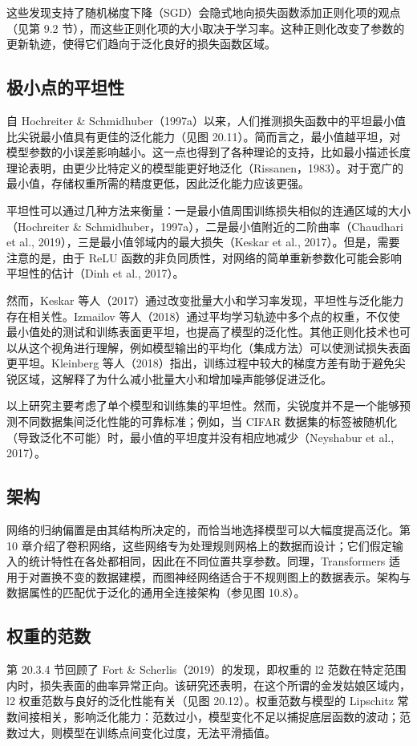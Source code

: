 这些发现支持了随机梯度下降（SGD）会隐式地向损失函数添加正则化项的观点（见第 9.2 节），而这些正则化项的大小取决于学习率。这种正则化改变了参数的更新轨迹，使得它们趋向于泛化良好的损失函数区域。

\subsection{极小点的平坦性}
自 Hochreiter \& Schmidhuber（1997a）以来，人们推测损失函数中的平坦最小值比尖锐最小值具有更佳的泛化能力（见图 20.11）。简而言之，最小值越平坦，对模型参数的小误差影响越小。这一点也得到了各种理论的支持，比如最小描述长度理论表明，由更少比特定义的模型能更好地泛化（Rissanen，1983）。对于宽广的最小值，存储权重所需的精度更低，因此泛化能力应该更强。

平坦性可以通过几种方法来衡量：一是最小值周围训练损失相似的连通区域的大小（Hochreiter \& Schmidhuber，1997a），二是最小值附近的二阶曲率（Chaudhari et al., 2019），三是最小值邻域内的最大损失（Keskar et al., 2017）。但是，需要注意的是，由于 ReLU 函数的非负同质性，对网络的简单重新参数化可能会影响平坦性的估计（Dinh et al., 2017）。

然而，Keskar 等人（2017）通过改变批量大小和学习率发现，平坦性与泛化能力存在相关性。Izmailov 等人（2018）通过平均学习轨迹中多个点的权重，不仅使最小值处的测试和训练表面更平坦，也提高了模型的泛化性。其他正则化技术也可以从这个视角进行理解，例如模型输出的平均化（集成方法）可以使测试损失表面更平坦。Kleinberg 等人（2018）指出，训练过程中较大的梯度方差有助于避免尖锐区域，这解释了为什么减小批量大小和增加噪声能够促进泛化。

以上研究主要考虑了单个模型和训练集的平坦性。然而，尖锐度并不是一个能够预测不同数据集间泛化性能的可靠标准；例如，当 CIFAR 数据集的标签被随机化（导致泛化不可能）时，最小值的平坦度并没有相应地减少（Neyshabur et al., 2017）。

\subsection{架构}
网络的归纳偏置是由其结构所决定的，而恰当地选择模型可以大幅度提高泛化。第 10 章介绍了卷积网络，这些网络专为处理规则网格上的数据而设计；它们假定输入的统计特性在各处都相同，因此在不同位置共享参数。同理，Transformers 适用于对置换不变的数据建模，而图神经网络适合于不规则图上的数据表示。架构与数据属性的匹配优于泛化的通用全连接架构（参见图 10.8）。

\subsection{权重的范数}
第 20.3.4 节回顾了 Fort \& Scherlis（2019）的发现，即权重的 l2 范数在特定范围内时，损失表面的曲率异常正向。该研究还表明，在这个所谓的金发姑娘区域内，l2 权重范数与良好的泛化性能有关（见图 20.12）。权重范数与模型的 Lipschitz 常数间接相关，影响泛化能力：范数过小，模型变化不足以捕捉底层函数的波动；范数过大，则模型在训练点间变化过度，无法平滑插值。

